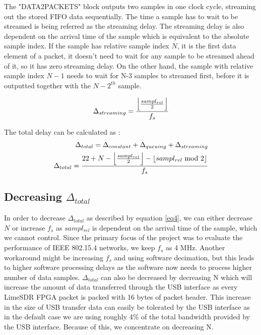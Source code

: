The "DATA2PACKETS" block outputs two samples in one clock cycle, streaming out the stored FIFO data sequentially.
The time a sample has to wait to be streamed is being referred as the streaming delay.
The streaming delay is also dependent on the arrival time of the sample which is equivalent to the absolute sample index.
If the sample has relative sample index $N$, it is the first data element of a packet, it doesn't need to wait for any sample to be streamed ahead of it, so it has zero streaming delay.
On the other hand, the sample with relative sample index $N-1$ needs to wait for N-3 samples to streamed first, before it is outputted together with the $N-2^{th}$ sample.

\begin{equation}\label{eq3}
\Delta_{streaming} =\frac{\floor*{\frac{sampl_{rel}}{2}}}{f_s}
\end{equation} 


The total delay can be calculated as :\\
\begin{subequations}\label{eq4}
\begin{align}
\Delta_{total}= \Delta_{constant} + \Delta_{queuing} + \Delta_{streaming} \\
\Delta_{total}= \frac{22 +  N - \floor*{\frac{sampl_{rel}}{2}} - \floor*{sampl_{rel} \ \text{mod} \ 2}}{f_s}
\end{align}
\end{subequations}

\subsection{Decreasing $\Delta_{total}$} \label{decrease}

In order to decrease $\Delta_{total}$ as described by equation \ref{eq4}, we can either decrease $N$ or increase $f_s$ as $sampl_{rel}$ is dependent on the arrival time of the sample, which we cannot control.
Since the primary focus of the project was to evaluate the performance of IEEE 802.15.4 networks, we keep $f_s$ as 4 MHz.
Another workaround might be increasing $f_s$ and using software decimation, but this leads to higher software processing delays as the software now needs to process higher number of data samples.
$\Delta_{total}$ can also be decreased by decreasing N which will increase the amount of data transferred through the USB interface as every LimeSDR FPGA packet is packed with 16 bytes of packet header.
This increase in the size of USB transfer data can easily be tolerated by the USB interface as in the default case we are using roughly 4\% of the total bandwidth provided by the USB interface.
Because of this, we concentrate on decreasing N.\\

